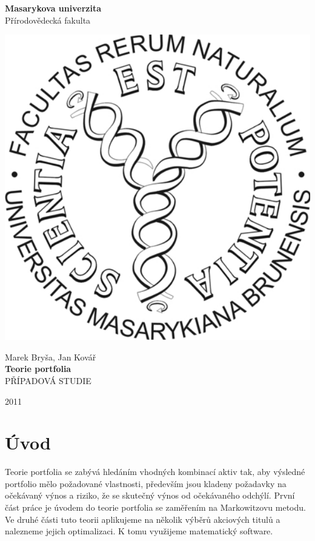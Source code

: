 \documentclass[12pt,a4paper]{report}
\begin{document}
\thispagestyle{empty}
\vfill
\begin{center}
{\Large \bf Masarykova univerzita\\[1ex]}
{\large Přírodovědecká fakulta}
\end{center}
\vfill
\begin{center}
\includegraphics[scale=0.7]{prf_logo.pdf}
\end{center}
\begin{center}
\vfill

Marek Bryša, Jan Kovář\\[3em]
{\LARGE \bf Teorie portfolia}\\[1em]
PŘÍPADOVÁ STUDIE\\
\vfill

{2011}
\end{center}

\setcounter{page}{0}
\newpage

\tableofcontents

\chapter*{Úvod}
Teorie portfolia se zabývá hledáním vhodných kombinací aktiv tak, aby výsledné portfolio mělo požadované vlastnosti, především jsou kladeny požadavky na očekávaný výnos a riziko, že se skutečný výnos od očekávaného odchýlí. První část práce je úvodem do teorie portfolia se zaměřením na Markowitzovu metodu. Ve druhé části tuto teorii aplikujeme na několik výběrů akciových titulů a nalezneme jejich optimalizaci. K tomu využijeme matematický software.
\end{document}
